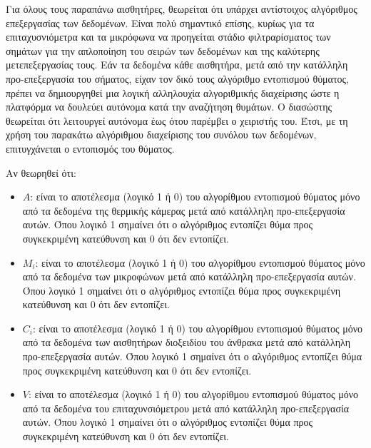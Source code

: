 \par Για όλους τους παραπάνω αισθητήρες, θεωρείται ότι υπάρχει αντίστοιχος αλγόριθμος επεξεργασίας των δεδομένων. Είναι πολύ σημαντικό επίσης, κυρίως για τα επιταχυσνιόμετρα και τα μικρόφωνα να προηγείται στάδιο φιλτραρίσματος των σημάτων για την απλοποίηση του σειρών των δεδομένων και της καλύτερης μετεπεξεργασίας τους. Εάν τα δεδομένα κάθε αισθητήρα, μετά από την κατάλληλη προ-επεξεργασία του σήματος, είχαν τον δικό τους αλγόριθμο εντοπισμού θύματος, πρέπει να δημιουργηθεί μια λογική αλληλουχία αλγοριθμικής διαχείρισης ώστε η πλατφόρμα να δουλεύει αυτόνομα κατά την αναζήτηση θυμάτων. Ο διασώστης θεωρείται ότι λειτουργεί αυτόνομα έως ότου παρέμβει ο χειριστής του. Έτσι, με τη χρήση του παρακάτω αλγόριθμου διαχείρισης του συνόλου των δεδομένων, επιτυγχάνεται ο εντοπισμός του θύματος.
\par Αν θεωρηθεί ότι:
\begin{itemize}
    \item $A$: είναι το αποτέλεσμα (λογικό 1 ή 0) του αλγορίθμου εντοπισμού θύματος μόνο από τα δεδομένα της θερμικής κάμερας μετά από κατάλληλη προ-επεξεργασία αυτών. Όπου λογικό 1 σημαίνει ότι ο αλγόριθμος εντοπίζει θύμα προς συγκεκριμένη κατεύθυνση και 0 ότι δεν εντοπίζει.
    \item $M_i$: είναι το αποτέλεσμα (λογικό 1 ή 0) του αλγορίθμου εντοπισμού θύματος μόνο από τα δεδομένα των μικροφώνων μετά από κατάλληλη προ-επεξεργασία αυτών. Όπου λογικό 1 σημαίνει ότι ο αλγόριθμος εντοπίζει θύμα προς συγκεκριμένη κατεύθυνση και 0 ότι δεν εντοπίζει.
    \item $C_i$: είναι το αποτέλεσμα (λογικό 1 ή 0) του αλγορίθμου εντοπισμού θύματος μόνο από τα δεδομένα των αισθητήρων διοξειδίου του άνθρακα μετά από κατάλληλη προ-επεξεργασία αυτών. Όπου λογικό 1 σημαίνει ότι ο αλγόριθμος εντοπίζει θύμα προς συγκεκριμένη κατεύθυνση και 0 ότι δεν εντοπίζει.
    \item $V$: είναι το αποτέλεσμα (λογικό 1 ή 0) του αλγορίθμου εντοπισμού θύματος μόνο από τα δεδομένα του επιταχυνσιόμετρου μετά από κατάλληλη προ-επεξεργασία αυτών. Όπου λογικό 1 σημαίνει ότι ο αλγόριθμος εντοπίζει θύμα προς συγκεκριμένη κατεύθυνση και 0 ότι δεν εντοπίζει.
\end{itemize}


